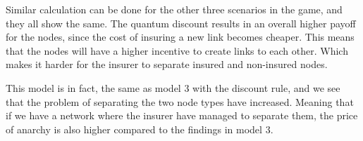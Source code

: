 Similar calculation can be done for the other three scenarios in the game, and they all show the same. The quantum discount results in an overall higher payoff for the nodes, since the cost of insuring a new link becomes cheaper. This means that the nodes will have a higher incentive to create links to each other. Which makes it harder for the insurer to separate insured and non-insured nodes.

This model is in fact, the same as model 3 with the discount rule, and we see that the problem of separating the two node types have increased. Meaning that if we have a network where the insurer have managed to separate them, the price of anarchy is also higher compared to the findings in model 3. 







